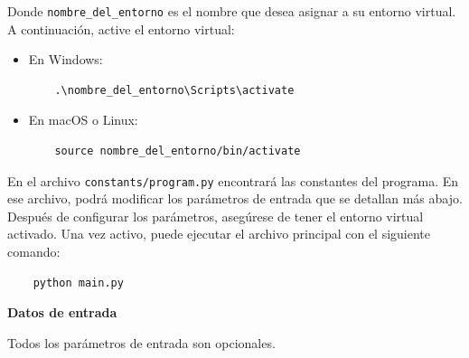 \documentclass{article}
\begin{document}
Donde \texttt{nombre\_del\_entorno} es el nombre que desea asignar a su entorno virtual. 
A continuación, active el entorno virtual:

\begin{itemize}
  \item En Windows:
  \begin{verbatim}
    .\nombre_del_entorno\Scripts\activate
  \end{verbatim}
  \item En macOS o Linux:
  \begin{verbatim}
    source nombre_del_entorno/bin/activate
  \end{verbatim}
\end{itemize}

En el archivo \texttt{constants/program.py} encontrará las constantes del programa. 
En ese archivo, podrá modificar los parámetros de entrada que se detallan más abajo.\\

Después de configurar los parámetros, asegúrese de tener el entorno virtual activado. 
Una vez activo, puede ejecutar el archivo principal con el siguiente comando:

\begin{center}
  \begin{adjustbox}{minipage=\linewidth, center}
  \begin{verbatim}
    python main.py
  \end{verbatim}
  \end{adjustbox}
\end{center}

\textbf{Datos de entrada}

Todos los parámetros de entrada son opcionales.
\end{document}
